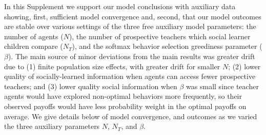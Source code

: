 \documentclass[letterpaper,11.5pt]{scrartcl}
\newcommand{\ps}[1]{{\textcolor{mygreen} {({\tiny PS:} #1)}}}
\begin{document}





In this Supplement we support our model conclusions with auxiliary data
showing, first, sufficient model convergence and, second, that our model
outcomes are stable over various settings of the three free auxiliary model
parameters: the number of agents ($N$), the number of
prospective teachers which social learner children compare
($N_T$), and the softmax behavior selection greediness parameter ($\beta$).
The main source of minor deviations from the main results was greater drift
due to (1) finite population size effects, with greater drift for smaller $N$;
(2) lower quality of socially-learned information when agents can access fewer
prospective teachers; and (3) lower quality social information when $\beta$
was small since teacher agents would have explored non-optimal behaviors more
frequently, so their observed payoffs would have less probability weight in
the optimal payoffs on average. We give details below of model convergence, and
outcomes as we varied the three auxiliary parameters $N$, $N_T$, and $\beta$.
\end{document}
